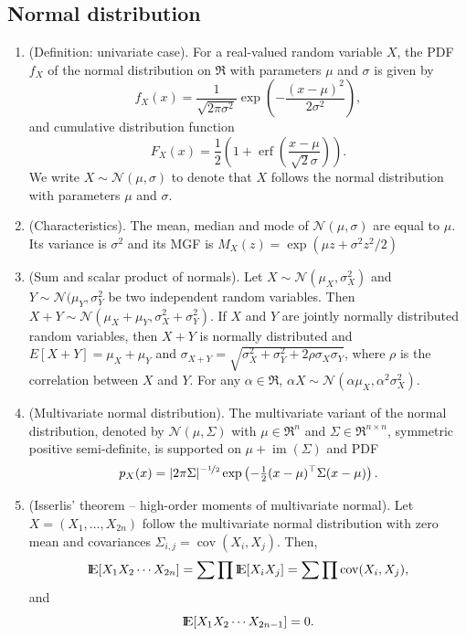 \documentclass[a4paper,10pt]{scrbook}
\begin{document}
\subsection{Normal distribution}\label{sec:normal_distribution}
\begin{enumerate}
 \item (\hypertarget{link:normal-distribution}{Definition: univariate case}). 
        For a real-valued random variable \(X\), the PDF \(f_X\) of the normal 
       distribution on \(\Re\) with parameters \(\mu\) and \(\sigma\) is given by
 \[
  f_X(x) = \frac{1}{\sqrt{2\pi \sigma^2}}\exp\left(-\frac{(x-\mu)^2}{2\sigma^2}\right),
 \]
 and cumulative distribution function 
 \[
  F_X(x) = \frac{1}{2}\left( 1 + \operatorname{erf}\left(\frac{x-\mu}{\sqrt{2} \sigma}\right) \right).
 \]
 We write \(X\sim \mathcal{N}(\mu, \sigma)\) to denote that \(X\) follows the normal distribution 
 with parameters \(\mu\) and \(\sigma\).

 \item (Characteristics). The mean, median and mode of \(\mathcal{N}(\mu, \sigma)\) are equal to \(\mu\).
       Its variance is \(\sigma^2\) and its MGF is \(M_X(z) = \exp(\mu z + \sigma^2 z^2/2)\)

 \item (Sum and scalar product of normals). Let \(X\sim\mathcal{N}(\mu_X, \sigma_X^2)\) and 
       \(Y\sim\mathcal{N}(\mu_Y, \sigma_Y^2\) be two independent random variables. 
       Then \(X+Y\sim\mathcal{N}(\mu_X+\mu_Y, \sigma_X^2 + \sigma_Y^2)\).
       If \(X\) and \(Y\) are jointly normally distributed random variables, then 
       \(X+Y\) is normally distributed and \(E[X+Y] = \mu_X + \mu_Y\) and 
       \(\sigma_{X+Y} = \sqrt{\sigma_X^2 + \sigma_Y^2 + 2\rho\sigma_X\sigma_Y}\), where 
       \(\rho\) is the correlation between \(X\) and \(Y\).
       For any \(\alpha\in\Re\), \(\alpha X\sim \mathcal{N}(\alpha\mu_X, \alpha^2\sigma_X^2)\).
       
 \item (Multivariate normal distribution). The multivariate variant of the normal distribution,
       denoted by $\mathcal{N}(\mu, \Sigma)$ with $\mu\in\Re^n$ and $\Sigma\in\Re^{n\times n}$,
       symmetric positive semi-definite, is supported on $\mu + \operatorname{im}(\Sigma)$
       and PDF 
       \[
        p_X(x) = |2\pi \Sigma|^{-\nicefrac{1}{2}}\exp\left(-\tfrac{1}{2}(x-\mu)^{\top}\Sigma(x-\mu)\right).
       \]

 \item (Isserlis' theorem -- high-order moments of multivariate normal). Let \(X= (X_1, \ldots, X_{2n})\)
       follow the multivariate normal distribution with zero mean and covariances 
       $\Sigma_{i,j} = \operatorname{cov}(X_i, X_j)$. Then,
       \[
        \E[X_1 X_2 \cdots X_{2n}] = \sum\prod \E[X_iX_j] = \sum\prod \operatorname{cov}(X_i, X_j),
       \]
       and 
       \[
        \E[X_1 X_2 \cdots X_{2n-1}] = 0.
       \]



\end{enumerate}
\end{document}
